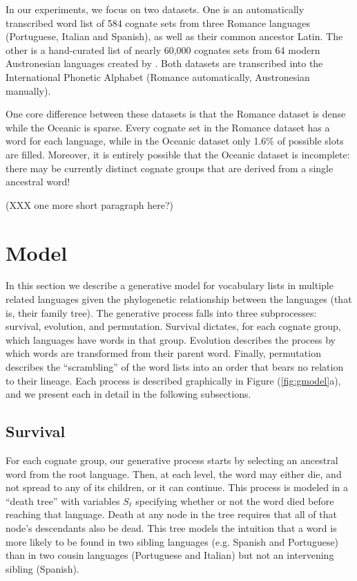 \documentclass[11pt,a4paper]{article}
\begin{document}
In our experiments, we focus on two datasets. One is an automatically
transcribed word list of 584 cognate sets from three Romance languages
(Portuguese, Italian and Spanish), as well as their common ancestor
Latin. \cite{bouchard07probabilistic} The other is a hand-curated
list of nearly 60,000 cognates sets from 64 modern Austronesian
languages created by . Both datasets are
transcribed into the International Phonetic Alphabet (Romance
automatically, Austronesian manually). 

One core difference between these datasets is that the Romance
dataset is dense while the Oceanic is sparse. Every cognate set in
the Romance dataset has a word for each language, while in the
Oceanic dataset only 1.6\% of possible slots are filled. Moreover,
it is entirely possible that the Oceanic dataset is incomplete:
there may be currently distinct cognate groups that are derived
from a single ancestral word!

(XXX one more short paragraph here?)

\section{Model}

In this section we describe a generative model for vocabulary lists
in multiple related languages given the phylogenetic relationship
between the languages (that is, their family tree). The generative
process falls into three subprocesses: survival, evolution, and
permutation. Survival dictates, for each cognate group, which
languages have words in that group. Evolution describes the process
by which words are transformed from their parent word. Finally,
permutation describes the ``scrambling'' of the word lists into an
order that bears no relation to their lineage. Each process is
described graphically in Figure (\ref{fig:gmodel}a), and we present
each in detail in the following subsections.

\subsection{Survival}

For each cognate group, our generative process starts by selecting
an ancestral word from the root language. Then, at each level, the
word may either die, and not spread to any of its children, or it
can continue. This process is modeled in a ``death tree'' with
variables $S_\ell$ specifying whether or not the word died before
reaching that language. Death at any node in the tree requires that
all of that node's descendants also be dead. This tree models the
intuition that a word is more likely to be found in two sibling
languages (e.g. Spanish and Portuguese) than in two cousin languages
(Portuguese and Italian) but not an intervening sibling
(Spanish). 
\end{document}
